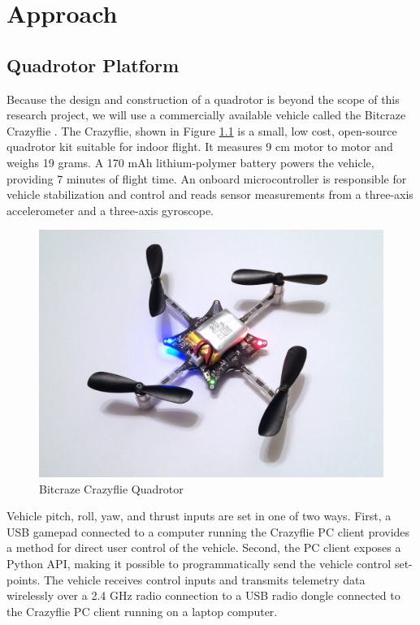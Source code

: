 \chapter{Approach}\label{approach}

\section{Quadrotor Platform}
Because the design and construction of a quadrotor is beyond the scope of  this research project, we will use a commercially available vehicle called the Bitcraze Crazyflie \cite{bitcraze}. The Crazyflie, shown in Figure \ref{fig:quad} is a small, low cost, open-source quadrotor kit suitable for indoor flight. It measures 9 cm motor to motor and weighs 19 grams. A 170 mAh lithium-polymer battery powers the vehicle, providing 7 minutes of flight time. An onboard microcontroller is responsible for vehicle stabilization and control and reads sensor measurements from a three-axis accelerometer and a three-axis gyroscope.
\begin{figure}[!htb]
\centering \includegraphics[scale=.11]{../fig/crazyflie.jpg}
\caption{Bitcraze Crazyflie Quadrotor}
\label{fig:quad}
\end{figure}

Vehicle pitch, roll, yaw, and thrust inputs are set in one of two ways. First, a USB gamepad connected to a computer running the Crazyflie PC client provides a method for direct user control of the vehicle. Second, the PC client exposes a Python API, making it possible to programmatically send the vehicle control set-points. The vehicle receives control inputs and transmits telemetry data wirelessly over a 2.4 GHz radio connection to a USB radio dongle connected to the Crazyflie PC client running on a laptop computer.

